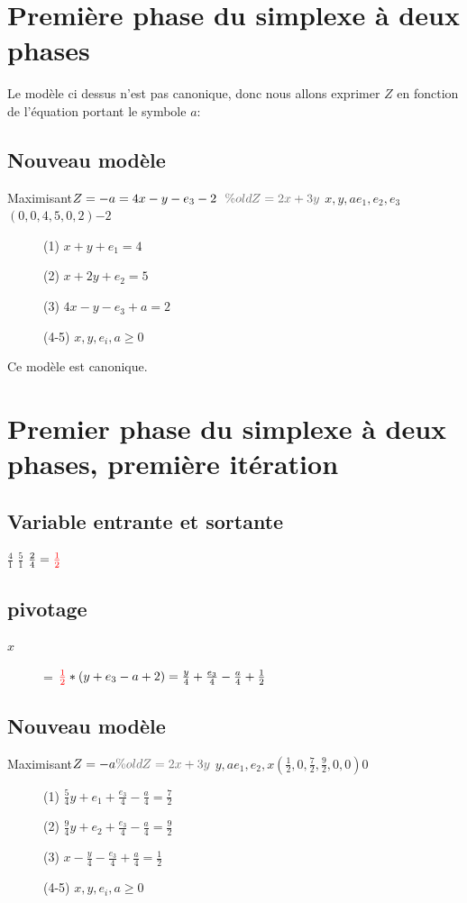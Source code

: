 \section{Première phase du simplexe à deux phases}
Le modèle ci dessus n'est pas canonique, donc nous allons exprimer $Z$ en fonction de l'équation portant le symbole $a$:\\
\subsection{Nouveau modèle}
        {Maximisant}{$Z = -a = 4x -y -e_3 -2\ \ \cgris{\% oldZ = 2x + 3y}$}
        {$x,y,a$}{$e_1,e_2,e_3$}{$(0,0,4,5,0,2)$}{$-2$}
        {\begin{description}
\item[] (1) $x + y + e_1 = 4$
\item[] (2) $x + 2y + e_2 = 5$
\item[] (3) $4x -y - e_3 + a = 2$
\item[] (4-5) $x,y,e_i,a \geqslant 0$
\end{description}
}
Ce modèle est canonique.

\section{Premier phase du simplexe à deux phases, première itération}
\subsection{Variable entrante et sortante}
  {$\frac{4}{1}$}
  {$\frac{5}{1}$}
  {$\frac{2}{4} = \textcolor{red}{\frac{1}{2}}$}

\subsection{pivotage}
\begin{description}
\item[$x$] = $\textcolor{red}{\frac{1}{2}}*(y+ e_3 -a +2) = \frac{y}{4} + \frac{e_3}{4} - \frac{a}{4} + \frac{1}{2}$
\end{description}

\subsection{Nouveau modèle}
        {Maximisant}{$Z = -a \\ \cgris{\% oldZ = 2x + 3y}$}
        {$y,a$}{$e_1,e_2,x$}{$(\frac{1}{2},0,\frac{7}{2}, \frac{9}{2}, 0,0)$}{$0$}
        {\begin{description}
\item[] (1) $\frac{5}{4}y + e_1 + \frac{e_3}{4} - \frac{a}{4} = \frac{7}{2}$
\item[] (2) $\frac{9}{4}y + e_2 + \frac{e_3}{4} - \frac{a}{4} = \frac{9}{2}$
\item[] (3) $x - \frac{y}{4} - \frac{e_3}{4} + \frac{a}{4} = \frac{1}{2}$
\item[] (4-5) $x,y,e_i,a \geqslant 0$
\end{description}
}

